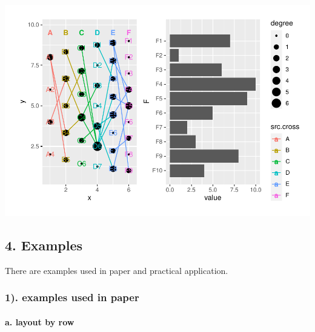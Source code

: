 \documentclass[
]{article}
\let\oldparagraph\paragraph
\renewcommand{\paragraph}[1]{\oldparagraph{#1}\mbox{}}
\begin{document}
\includegraphics{ReadMe_files/figure-latex/unnamed-chunk-10-1.pdf}

\hypertarget{examples}{%
\subsection{4. Examples}\label{examples}}

There are examples used in paper and practical application.

\hypertarget{examples-used-in-paper}{%
\subsubsection{1). examples used in
paper}\label{examples-used-in-paper}}

\hypertarget{a.-layout-by-row}{%
\paragraph{a. layout by row}\label{a.-layout-by-row}}
\end{document}
